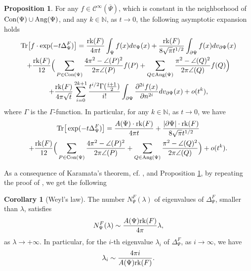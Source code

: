 \documentclass[12pt]{article}
\numberwithin{equation}{section}
\theoremstyle{theorem}
\theoremstyle{definition}
\newtheorem{prop}[thm]{Proposition}
\newtheorem{cor}[thm]{Corollary}
\theoremstyle{remark}
\newcommand{\nat}{\mathbb{N}}
\newcommand{\ccal}{\mathscr{C}}
\newcommand{\laplcomp}{\Delta}
\newcommand{\rk}[1]{{\rm{rk}} ( #1 )}
\newcommand{\tr}[1]{{\rm{Tr}} \big[ #1 \big]}
\begin{document}
	 	\begin{prop}\label{prop_hk_expansion}
	 		For any $f \in \ccal^{\infty}(\overline{\Psi})$, which is constant in the neighborhood of ${\rm{Con}}(\Psi) \cup {\rm{Ang}}(\Psi)$, and any $k \in \nat$, as $t \to 0$, the following asymptotic expansion holds
	 		\begin{multline}
	 			\tr{f \cdot \exp(-t \laplcomp_{\Psi}^{F})}  
	 			= 
	 			\frac{\rk{F}}{4 \pi t} \int_{\Psi} f(x) dv_{\Psi}(x)
	 			+ 
	 			\frac{\rk{F}}{8 \sqrt{\pi} t^{1/2}}  \int_{\partial \Psi} f(x) dv_{\partial \Psi}(x)
	 			\\
	 			+
	 			\frac{\rk{F}}{12} \Big( \sum_{P \in {\rm{Con}}(\Psi)} \frac{4 \pi^2 - \angle(P)^2}{2 \pi \angle(P)} f(P)
	 			+
	 			\sum_{Q \in {\rm{Ang}}(\Psi)} \frac{\pi^2 - \angle(Q)^2}{2 \pi \angle(Q)} f(Q) \Big)
	 			\\
	 			+
	 			\frac{\rk{F}}{4 \pi \sqrt{t}} \sum_{i = 0}^{2k + 1} \frac{t^{i/2} \Gamma(\frac{i + 1}{2})}{i!} \int_{\partial \Psi} \frac{\partial^{2i} f(x)}{\partial n^{2i}} dv_{\partial \Psi}(x)
	 			+
	 			o(t^{k}),
	 		\end{multline}
	 		where $\Gamma$ is the $\Gamma$-function.
	 		In particular, for any $k \in \nat$, as $t \to 0$, we have 
	 		\begin{multline}
	 			\tr{\exp(-t \laplcomp_{\Psi}^{F})}  
	 			= 
	 			\frac{A(\Psi) \cdot \rk{F}}{4 \pi t}
	 			+ 
	 			\frac{|\partial \Psi| \cdot \rk{F}}{8 \sqrt{\pi} t^{1/2}} 
	 			\\
	 			+
	 			\frac{\rk{F}}{12} \Big( \sum_{P \in {\rm{Con}}(\Psi)} \frac{4 \pi^2 - \angle(P)^2}{2 \pi \angle(P)}
	 			+
	 			\sum_{Q \in {\rm{Ang}}(\Psi)} \frac{\pi^2 - \angle(Q)^2}{2 \pi \angle(Q)} \Big)
	 			+
	 			o(t^{k}).
	 		\end{multline}
	 	\end{prop}
	 	As a consequence of Karamata's theorem, cf. \cite[Theorem 2.42]{BGV}, and Proposition \ref{prop_hk_expansion}, by repeating the proof of \cite[Corollary 2.43]{BGV}, we get the following  
	 	\begin{cor}[Weyl's law]\label{cor_as_linear_growth}
	 		The number $N_{\Psi}^{F}(\lambda)$ of eigenvalues of $\laplcomp_{\Psi}^{F}$, smaller than $\lambda$, satisfies
	 		\begin{equation}
	 			N_{\Psi}^{F}(\lambda) \sim \frac{A(\Psi) \rk{F}}{4 \pi}  \lambda,
	 		\end{equation}
	 		as $\lambda \to + \infty$.
	 		In particular, for the $i$-th eigenvalue $\lambda_i$ of $\laplcomp_{\Psi}^{F}$, as $i \to \infty$, we have
	 		\begin{equation}\label{weyl_law}
	 			\lambda_i \sim \frac{4 \pi i}{A(\Psi) \rk{F}}.
	 		\end{equation}
	 	\end{cor}
\end{document}
